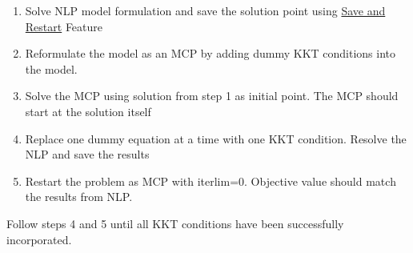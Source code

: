 \documentclass{article}
\begin{document}
\begin{comment}

\begin{equation}
\begin{aligned}
& \bigtriangledown{f(\hat{x})} - \sum_{i=1}^{m} u_{i} \bigtriangledown{g_{i}(\hat{x})}
			- \sum_{k=1}^{p} v_{i} \bigtriangledown{h_{k}(\hat{x})} - \sum_{l=1}^{q} w_{i} \bigtriangledown{d_{l}(\hat{x})} = 0  \\
\\
& h_{k}(\hat{x}) = 0   k = 1,2...p  \\
g_{i}(\hat{x}) \leq 0&	 i = 1,2...m \\  d_{l}(\hat{x}) \geq =0	&	l = 1,2...q
\\
and,\\
<u_{i},g_{i}(x)> = 0 \\ <v_{i},h_{k}(x)> =0 \\  <w_{l},d_{l}(x)> =0
\end{aligned}
\end{equation}

where $<u_{i},g_{i}(x)> = 0$  represent the complementarity condition and variables u, v, and w represent the marginals of the respective constraint. It is often written as

 $g_{i}(x) \perp L \leq u \leq U $

where symbol $\perp $(referred to as perpendicular  to) indicates pair-wise complementarity between the function g() and variable u and its bounds. The complementarity condition essentially

\end{comment}


\begin{enumerate}
	\item Solve NLP model formulation and save the solution point using \href{https://www.gams.com/latest/docs/UG_SaveRestart.html}{Save and Restart} Feature
	\item	Reformulate the model as an MCP by adding dummy KKT conditions into the model.
  \item Solve the MCP using solution from step 1 as initial point. The MCP should start at the solution itself
	\item Replace one dummy equation at a time with one KKT condition. Resolve the NLP and save the results
	\item Restart the problem as MCP with iterlim=0. Objective value should match the results from NLP.
\end{enumerate}
\noindent Follow steps 4 and 5 until all KKT conditions have been successfully incorporated.
\end{document}
